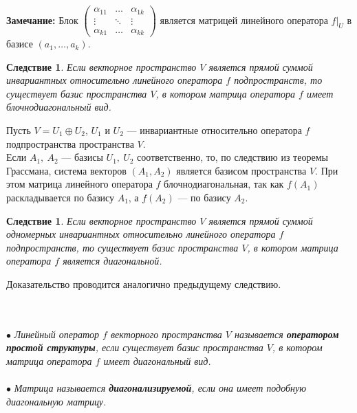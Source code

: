 \textbf{Замечание:} Блок 		$\begin{pmatrix} \alpha_{11} & \dots & \alpha_{1k}  \\ \vdots & \ddots & \vdots \\ \alpha_{k1} & \dots & \alpha_{kk} \end{pmatrix}$ является матрицей линейного оператора $f|_U$ в базисе $(a_1, \dots, a_k).$ 
\newtheorem*{cor11_6_1}{Следствие}\begin{cor11_6_1}Если векторное пространство $V$ является прямой суммой инвариантных относительно линейного оператора $f$ подпространств, то существует базис пространства $V$, в котором матрица оператора $f$ имеет блочнодиагональный вид.
\end{cor11_6_1}\begin{Proof} Пусть $V = U_1 \oplus U_2$, $U_1$ и $U_2$ --- инвариантные относительно оператора $f$ подпространства пространства $V$.\\
	Если $ A_1,\ A_2$ --- базисы $U_1,\ U_2$ соответственно, то, по следствию из теоремы Грассмана, система векторов $(A_1, A_2)$ является базисом пространства $V$. При этом матрица линейного оператора $f$ блочнодиагональная, так как $f(A_1)$ раскладывается по базису $A_1$, а $f(A_2)$ --- по базису $A_2.$
\end{Proof}
\newtheorem*{cor11_6_2}{Следствие}\begin{cor11_6_2}Если векторное пространство $V$ является прямой суммой одномерных инвариантных относительно линейного оператора $f$ подпространств, то существует базис пространства $V$, в котором матрица оператора $f$ является диагональной.
\end{cor11_6_2}\begin{Proof}
	Доказательство проводится аналогично предыдущему следствию.
\end{Proof}\\\\
$\bullet$ \textit{Линейный оператор $f$ векторного пространства $V$ называется  \textbf{оператором простой структуры}, если существует базис пространства $V$, в котором матрица оператора $f$ имеет диагональный вид.}\\\\
$\bullet$ \textit{Матрица называется \textbf{диагонализируемой}, если она имеет подобную диагональную матрицу.}














